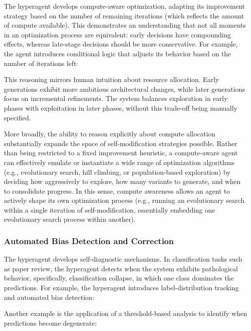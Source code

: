 \documentclass{article}
\begin{document}
The hyperagent develops compute-aware optimization, adapting its improvement strategy based on the number of remaining iterations (which reflects the amount of compute available). This demonstrates an understanding that not all moments in an optimization process are equivalent: early decisions have compounding effects, whereas late-stage decisions should be more conservative. For example, the agent introduces conditional logic that adjusts its behavior based on the number of iterations left:


This reasoning mirrors human intuition about resource allocation. Early generations exhibit more ambitious architectural changes, while later generations focus on incremental refinements. The system balances exploration in early phases with exploitation in later phases, without this trade-off being manually specified.

More broadly, the ability to reason explicitly about compute allocation substantially expands the space of self-modification strategies possible. Rather than being restricted to a fixed improvement heuristic, a compute-aware agent can effectively emulate or instantiate a wide range of optimization algorithms (e.g., evolutionary search, hill climbing, or population-based exploration) by deciding how aggressively to explore, how many variants to generate, and when to consolidate progress. In this sense, compute awareness allows an agent to actively shape its own optimization process (e.g., running an evolutionary search within a single iteration of self-modification, essentially embedding one evolutionary search process within another).

\subsubsection{Automated Bias Detection and Correction}

The hyperagent develops self-diagnostic mechanisms. In classification tasks such as paper review, the hyperagent detects when the system exhibits pathological behavior, specifically, classification collapse, in which one class dominates the predictions. For example, the hyperagent introduces label-distribution tracking and automated bias detection:


Another example is the application of a threshold-based analysis to identify when predictions become degenerate:

\end{document}

